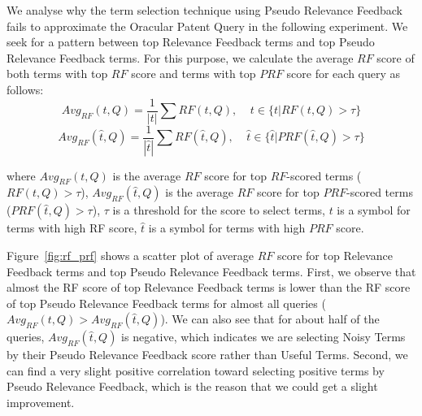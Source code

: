 We analyse why the term selection technique using Pseudo Relevance Feedback fails to approximate the Oracular Patent Query in the following experiment.  
We seek for a pattern between top Relevance Feedback terms and top Pseudo Relevance Feedback terms. For this purpose, we calculate the average $\mathit{RF}$ score of both terms with top  $\mathit{RF}$ score and terms with top $\mathit{PRF}$ score for each query as follows:
\begin{equation}
Avg_{RF}(t, Q) = \frac{1}{|t|}\sum {RF}(t, Q), \;\;\;\; t\in \{t | RF(t, Q)>\tau\}
\end{equation}
\begin{equation}
Avg_{RF}(\hat{t}, Q) = \frac{1}{|\hat{t}|}\sum {RF}(\hat{t}, Q), \;\;\;\; \hat{t}\in \{\hat{t} | PRF(\hat{t}, Q)>\tau\} 
\end{equation}

where $Avg_{RF}(t, Q)$ is the average  $\mathit{RF}$ score for top  $\mathit{RF}$-scored terms ($RF(t, Q)>\tau$), $Avg_{RF}(\hat{t}, Q)$ is the average  $\mathit{RF}$ score for top  $\mathit{PRF}$-scored terms ($PRF(\hat{t}, Q)>\tau$), $\tau$ is a threshold for the score to select terms, $t$ is a symbol for terms with high RF score, $\hat{t}$ is a symbol for terms with high $\mathit{PRF}$ score.

Figure~\ref{fig:rf_prf} shows a scatter plot of average $\mathit{RF}$ score for top Relevance Feedback terms and top Pseudo Relevance Feedback terms. First, we observe that almost the RF score of top Relevance Feedback terms is lower than the RF score of top Pseudo Relevance Feedback terms for almost all queries ($ Avg_{RF}(t, Q) > Avg_{RF}(\hat{t}, Q)$). We can also see that for about half of the queries, $Avg_{RF}(\hat{t}, Q)$ is negative, which indicates we are selecting Noisy Terms by their Pseudo Relevance Feedback score rather than Useful Terms. Second, we can find a very slight positive correlation toward selecting positive terms by Pseudo Relevance Feedback, which is the reason that we could get a slight improvement.  

